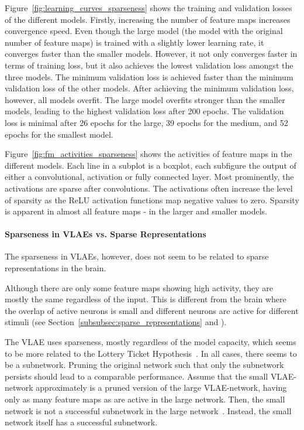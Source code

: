Figure~\ref{fig:learning_curves_sparseness} shows the training and validation losses of the different models.
Firstly, increasing the number of feature maps increases convergence speed.
Even though the large model (the model with the original number of feature maps) is trained with a slightly lower learning rate, it converges faster than the smaller models.
However, it not only converges faster in terms of training loss, but it also achieves the lowest validation loss amongst the three models.
The minimum validation loss is achieved faster than the minimum validation loss of the other models.
After achieving the minimum validation loss, however, all models overfit.
The large model overfits stronger than the smaller models, leading to the highest validation loss after 200 epochs.
The validation loss is minimal after 26 epochs for the large, 39 epochs for the medium, and 52 epochs for the smallest model.

Figure~\ref{fig:fm_activities_sparseness} shows the activities of feature maps in the different models.
Each line in a subplot is a boxplot, each subfigure the output of either a convolutional, activation or fully connected layer.
Most prominently, the activations are sparse after convolutions.
The activations often increase the level of sparsity as the ReLU activation functions map negative values to zero.
Sparsity is apparent in almost all feature maps - in the larger and smaller models.

\paragraph{Sparseness in \acp{VLAE} vs. Sparse Representations}
The sparseness in \acp{VLAE}, however, does not seem to be related to sparse representations in the brain.

Although there are only some feature maps showing high activity, they are mostly the same regardless of the input.
This is different from the brain where the overlap of active neurons is small and different neurons are active for different stimuli (see Section~\ref{subsubsec:sparse_representations} and \citet{yoshida2020natural}).

The \ac{VLAE} uses sparseness, mostly regardless of the model capacity, which seems to be more related to the Lottery Ticket Hypothesis~\citep{frankle2018lottery}.
In all cases, there seems to be a subnetwork.
Pruning the original network such that only the subnetwork persists should lead to a comparable performance.
Assume that the small \ac{VLAE}-network approximately is a pruned version of the large \ac{VLAE}-network, having only as many feature maps as are active in the large network.
Then, the small network is not a successful subnetwork in the large network~\citep{frankle2018lottery}.
Instead, the small network itself has a successful subnetwork.

